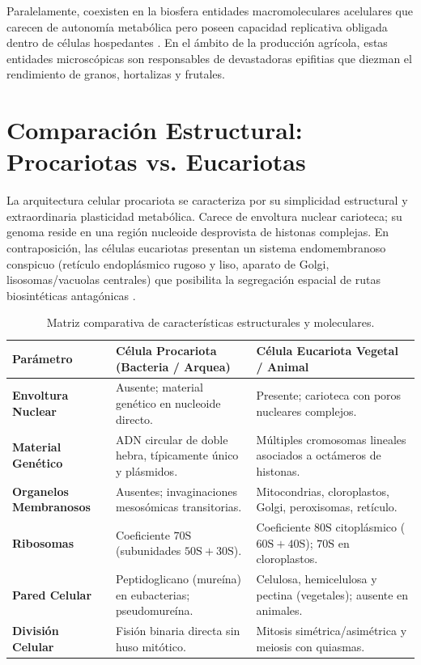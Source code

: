 \documentclass[12pt,spanish,letterpaper,oneside]{article}
\begin{document}
Paralelamente, coexisten en la biosfera entidades macromoleculares acelulares que carecen de autonomía metabólica pero poseen capacidad replicativa obligada dentro de células hospedantes \parencite{karp2014}. En el ámbito de la producción agrícola, estas entidades microscópicas son responsables de devastadoras epifitias que diezman el rendimiento de granos, hortalizas y frutales.

\section{Comparación Estructural: Procariotas vs. Eucariotas}
La arquitectura celular procariota se caracteriza por su simplicidad estructural y extraordinaria plasticidad metabólica. Carece de envoltura nuclear carioteca; su genoma reside en una región nucleoide desprovista de histonas complejas. En contraposición, las células eucariotas presentan un sistema endomembranoso conspicuo (retículo endoplásmico rugoso y liso, aparato de Golgi, lisosomas/vacuolas centrales) que posibilita la segregación espacial de rutas biosintéticas antagónicas \parencite{alberts2015, taiz2015}.

\begin{table}[h!]
\centering
\small
\begin{tabularx}{\textwidth}{lYY}
\toprule
\textbf{Parámetro} & \textbf{Célula Procariota (Bacteria / Arquea)} & \textbf{Célula Eucariota Vegetal / Animal} \\
\midrule
\textbf{Envoltura Nuclear} & Ausente; material genético en nucleoide directo. & Presente; carioteca con poros nucleares complejos. \\
\textbf{Material Genético} & ADN circular de doble hebra, típicamente único y plásmidos. & Múltiples cromosomas lineales asociados a octámeros de histonas. \\
\textbf{Organelos Membranosos} & Ausentes; invaginaciones mesosómicas transitorias. & Mitocondrias, cloroplastos, Golgi, peroxisomas, retículo. \\
\textbf{Ribosomas} & Coeficiente $70\text{S}$ (subunidades $50\text{S} + 30\text{S}$). & Coeficiente $80\text{S}$ citoplásmico ($60\text{S} + 40\text{S}$); $70\text{S}$ en cloroplastos. \\
\textbf{Pared Celular} & Peptidoglicano (mureína) en eubacterias; pseudomureína. & Celulosa, hemicelulosa y pectina (vegetales); ausente en animales. \\
\textbf{División Celular} & Fisión binaria directa sin huso mitótico. & Mitosis simétrica/asimétrica y meiosis con quiasmas. \\
\bottomrule
\end{tabularx}
\caption{Matriz comparativa de características estructurales y moleculares.}
\end{table}
\end{document}
